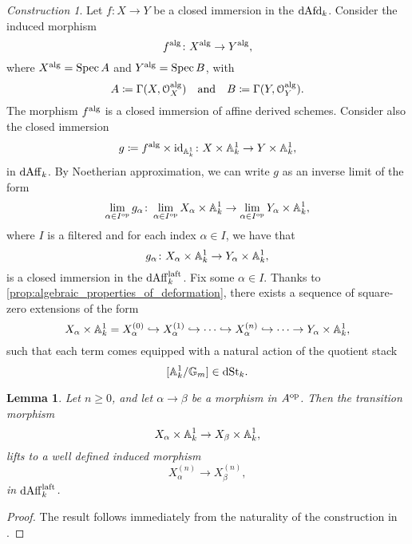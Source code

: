 \documentclass[10pt,a4paper,reqno]{amsart} %
\theoremstyle{plain}
\newtheorem{lem}[thm]{Lemma}
\theoremstyle{definition}
\theoremstyle{remark}
\numberwithin{equation}{section}
\newtheorem{construction}[thm]{Construction}
\begin{document}
\begin{construction} \label{const:construction_of_Hodge_filtration_in_the_lafp_case}
    Let $f \colon X \to Y$ be a closed immersion in the \infcat $\mathrm{dAfd}_k$. Consider the induced morphism
        \[
            f ^\mathrm{alg} \colon X^\mathrm{alg} \to Y^\mathrm{alg},   
        \]
    where $X ^\mathrm{alg} = \operatorname{Spec} A$ and $Y^\mathrm{alg} = \operatorname{Spec} B$, with
    \[A \coloneqq \Gamma(X, \mathcal O_X^\mathrm{alg}) \quad \mathrm{and} \quad B \coloneqq \Gamma(Y, \mathcal O_Y ^\mathrm{alg}).\]
    The morphism $f^\mathrm{alg}$ is a closed immersion of affine derived schemes. Consider also the closed immersion
        \[
            g \coloneqq f ^\mathrm{alg} \times \mathrm{id}_{\mathbb A^1_k} \colon X \times \mathbb A^1_k \to Y \times \mathbb A^1_k,  
        \]
    in $\mathrm{dAff}_k$. By Noetherian approximation, we can write $g$ as an inverse limit of the form
        \[
            \lim_{\alpha \in I ^\mathrm{op}}  g_\alpha \colon \lim_{\alpha \in I ^\mathrm{op}} X_\alpha \times \mathbb A^1_k \to \lim_{\alpha \in I ^\mathrm{op}} Y_\alpha \times \mathbb A^1_k,  
        \]
    where $I$ is a filtered \infcat and for each index $\alpha \in I$, we have that
        \[
            g_\alpha \colon X_\alpha \times \mathbb A^1_k \to Y_\alpha \times \mathbb A^1_k,  
        \]
    is a closed immersion in the \infcat $\mathrm{dAff}_k^{\mathrm{laft}}$. Fix some $\alpha \in I$. Thanks to \cref{prop:algebraic_properties_of_deformation},
    there exists a sequence of square-zero extensions of the form
        \[
            X_\alpha \times \mathbb A^1_k = X^{(0)}_\alpha \hookrightarrow X_\alpha^{(1)} \hookrightarrow \dots \hookrightarrow X_\alpha^{(n)} \hookrightarrow \dots \to Y_\alpha \times \mathbb A^1_k,  
        \]
    such that each term comes equipped with a natural action of the quotient stack 
        \[
            [\mathbb A^1_k / \mathbb G_m] \in \mathrm{dSt}_k.
        \]
\end{construction}

\begin{lem} \label{lem:naturality_of_Hodge_filtration_w.r.t_Noetherian_approximation}
    Let  $n \ge 0$, and let $\alpha \to \beta$ be a morphism in $A ^\mathrm{op}$. Then the transition morphism
        \[
            X_\alpha \times \mathbb A^1_k \to X_\beta \times \mathbb A^1_k,  
        \]
    lifts to a well defined induced morphism
        \[
            X_\alpha^{(n)} \to X_\beta^{(n)},
        \]
    in $\mathrm{dAff}_k^{\mathrm{laft}}$.
\end{lem}

\begin{proof}
    The result follows immediately from the naturality of the construction in \cite[\S 9.5.1]{Gaitsgory_Study_II}.
\end{proof}
\end{document}
